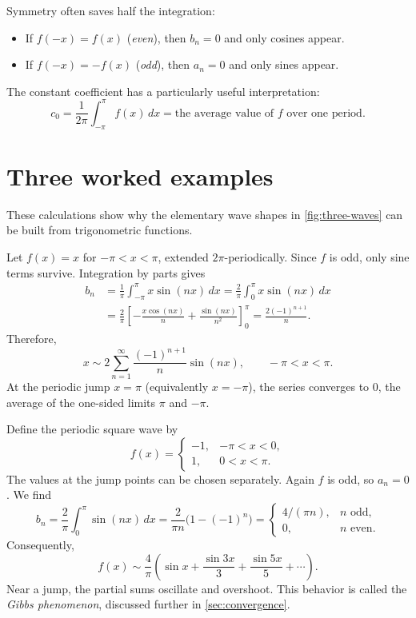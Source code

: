 Symmetry often saves half the integration:
\begin{itemize}
 \item If $f(-x)=f(x)$ (\emph{even}), then $b_n=0$ and only cosines appear.
 \item If $f(-x)=-f(x)$ (\emph{odd}), then $a_n=0$ and only sines appear.
\end{itemize}
The constant coefficient has a particularly useful interpretation:
\begin{equation}\label{eq:mean}
 c_0=\frac{1}{2\pi}\int_{-\pi}^{\pi} f(x)\,dx
 =\text{the average value of }f\text{ over one period}.
\end{equation}

\section{Three worked examples}\label{sec:examples}
These calculations show why the elementary wave shapes in
\cref{fig:three-waves} can be built from trigonometric functions.

\begin{example}[Sawtooth wave: $f(x)=x$]
Let $f(x)=x$ for $-\pi<x<\pi$, extended $2\pi$-periodically. Since $f$ is odd,
only sine terms survive. Integration by parts gives
\begin{align*}
 b_n&=\frac{1}{\pi}\int_{-\pi}^{\pi}x\sin(nx)\,dx
 =\frac{2}{\pi}\int_0^\pi x\sin(nx)\,dx\\
 &=\frac{2}{\pi}\left[-\frac{x\cos(nx)}n+\frac{\sin(nx)}{n^2}\right]_0^\pi
 =\frac{2(-1)^{n+1}}n.
\end{align*}
Therefore,
\begin{equation}\label{eq:sawtooth}
 \boxed{x\sim 2\sum_{n=1}^{\infty}\frac{(-1)^{n+1}}n\sin(nx),
 \qquad -\pi<x<\pi.}
\end{equation}
At the periodic jump $x=\pi$ (equivalently $x=-\pi$), the series converges
to $0$, the average of the one-sided limits $\pi$ and $-\pi$.

\end{example}

\begin{example}
Define the periodic square wave by
\[
 f(x)=\begin{cases}
 -1,&-\pi<x<0,\\
 1,&0<x<\pi.
 \end{cases}
\]
The values at the jump points can be chosen separately. Again $f$ is odd,
so $a_n=0$. We find
\[
 b_n=\frac{2}{\pi}\int_0^\pi\sin(nx)\,dx
 =\frac{2}{\pi n}\bigl(1-(-1)^n\bigr)
 =\begin{cases}4/(\pi n),&n\text{ odd},\\0,&n\text{ even}.
 \end{cases}
\]
Consequently,
\begin{equation}\label{eq:square}
 \boxed{f(x)\sim\frac{4}{\pi}\left(
 \sin x+\frac{\sin3x}{3}+\frac{\sin5x}{5}+\cdots\right).}
\end{equation}
Near a jump, the partial sums oscillate and overshoot. This behavior is
called the \emph{Gibbs phenomenon}, discussed further in
\cref{sec:convergence}.

\end{example}

